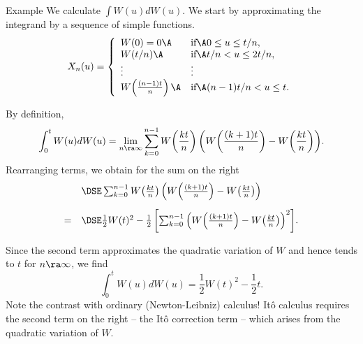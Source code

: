 Example
	We calculate $\int W(u) dW(u)$. We
	start by approximating the integrand by a sequence of simple
	functions.
	$$ X_n(u) = \left\{
		\begin{array}{ll}
		W(0)=0 \A &\mbox{if}\A 0 \leq u \leq t/n,\\ W(t/n) \A &\mbox{if}\A
		t/n < u \leq 2t/n,\\ \vdots &\vdots\\
		W\!\left(\frac{(n-1)t}{n}\right) \A &\mbox{if}\A (n-1)t/n < u \leq
		t.
		\end{array}
	\right. $$

	By definition,
		$$ \int_0^t W(u) dW(u) = \lim_{n \ra
		\infty} \sum_{k=0}^{n-1}
		 W\!\left(\frac{kt}{n}\right)
		 \left(W\!\left(\frac{(k+1)t}{n}\right)
		- W\!\left(\frac{kt}{n}\right)\right)\!. $$ Rearranging terms, we
	obtain for the sum on the right $$
	
	\begin{array}{ll}
		&\DSE \sum_{k=0}^{n-1} W\!\left(\frac{kt}{n}\right)
		\left(W\!\left(\frac{(k+1)t}{n}\right) -
		W\!\left(\frac{kt}{n}\right)\right)\\*[12pt]
		=& \DSE \frac{1}{2} W(t)^2 -\frac{1}{2} \left[\sum_{k=0}^{n-1}
		\left( W\!\left(\frac{(k+1)t}{n}\right) -
		W\!\left(\frac{kt}{n}\right)\right)^2 \right]\!.
		\end{array}
		$$

Since the second term approximates the quadratic variation of $W$
and hence tends to $t$ for $n \ra \infty$, we find
	\begin{equation}\label{BrownInt}
	\int_0^t W(u)dW(u) = \frac{1}{2}W(t)^2 - \frac{1}{2}t.
	\end{equation}
Note the contrast with ordinary (Newton-Leibniz) calculus! It\^{o}
calculus requires the second term on the right -- the It\^{o}
correction term -- which arises from the quadratic variation of
$W$.


